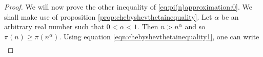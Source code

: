 \begin{proof}
		We will now prove the other inequality of \eqref{eq:pi(n)approximation:0}. We shall make use of proposition \eqref{prop:chebyshevthetainequality}.
		Let $\alpha$ be an arbitrary real number such that $0 < \alpha < 1$. Then $n> n^{\alpha}$ and so $\pi(n) \geq \pi(n^{\alpha})$. Using equation \eqref{eqn:chebyshevthetainequality1}, one can write
			\begin{align*}

\end{align*}
\end{proof}
